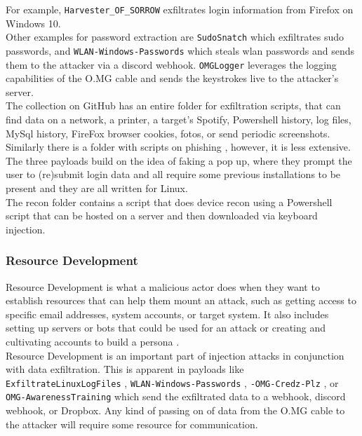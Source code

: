For example, \verb|Harvester_OF_SORROW| \cite{OmgpayloadsPayloadsLibrary} exfiltrates login information from Firefox on Windows 10. \\ 
Other examples for password extraction are \verb|SudoSnatch| \cite{OmgpayloadsPayloadsLibrary} which exfiltrates sudo passwords, and \verb|WLAN-Windows-Passwords| \cite{OmgpayloadsPayloadsLibrary}which steals wlan passwords and sends them to the attacker via a discord webhook. 
\verb|OMGLogger| \cite{OmgpayloadsPayloadsLibrary} leverages the logging capabilities of the O.MG cable and sends the keystrokes live to the attacker's server. \\
The collection on GitHub has an entire folder for exfiltration scripts, that can find data on a network, a printer, a target's Spotify, Powershell history, log files, MySql history, FireFox browser cookies, fotos, or send periodic screenshots. \\
Similarly there is a folder with scripts on phishing  \cite{OmgpayloadsPayloadsLibrary}, however, it is less extensive. The three payloads build on the idea of faking a pop up, where they prompt the user to (re)submit login data and all require some previous installations to be present and they are all written for Linux. \\
The recon folder contains a script that does device recon using a Powershell script that can be hosted on a server and then downloaded via keyboard injection. 


\subsubsection{Resource Development}

Resource Development is what a malicious actor does when they want to establish resources that can help them mount an attack, such as getting access to specific email addresses, system accounts, or target system. It also includes setting up servers or bots that could be used for an attack or creating and cultivating accounts to build a persona \cite{MITREATTCK}.\\
Resource Development is an important part of injection attacks in conjunction with data exfiltration. This is apparent in payloads like \verb|ExfiltrateLinuxLogFiles| \cite{OmgpayloadsPayloadsLibrary}, \verb|WLAN-Windows-Passwords| \cite{OmgpayloadsPayloadsLibrary}, \verb|-OMG-Credz-Plz| \cite{OmgpayloadsPayloadsLibrary}, or \verb|OMG-AwarenessTraining| \cite{OmgpayloadsPayloadsLibrary} which send the exfiltrated data to a webhook, discord webhook, or Dropbox. Any kind of passing on of data from the O.MG cable to the attacker will require some resource for communication. 


